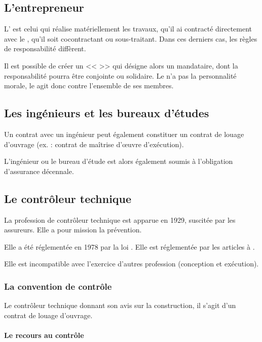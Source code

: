 		\subsection{L'entrepreneur}
		
			L'\E{} est celui qui réalise matériellement les travaux, qu'il ai contracté directement avec le \Mo{}, qu'il soit cocontractant ou sous-traitant. Dans ces derniers cas, les règles de responsabilité diffèrent.
			
			Il est possible de créer un << \GME{} >> qui désigne alors un mandataire, dont la responsabilité pourra être conjointe ou solidaire. Le \GME{} n'a pas la personnalité morale, le \Mo{} agit donc contre l'ensemble de ses membres.
		
		\subsection{Les ingénieurs et les bureaux d'études}
		
			Un contrat avec un ingénieur peut également constituer un contrat de louage d'ouvrage (ex. : contrat de maîtrise d'œuvre d'exécution).
			
			L'ingénieur ou le bureau d'étude est alors également soumis à l'obligation d'assurance décennale.
		
		\subsection{Le contrôleur technique}
		
			La profession de contrôleur technique est apparue en 1929, suscitée par les assureurs. Elle a pour mission la prévention.
			
			Elle a été réglementée en 1978 par la loi . Elle est réglementée par les articles  à .
			
			Elle est incompatible avec l'exercice d'autres profession (conception et exécution).
		
			\subsubsection{La convention de contrôle}
			
				Le contrôleur technique donnant son avis sur la construction, il s'agit d'un contrat de louage d'ouvrage.
			
				\paragraph{Le recours au contrôle}
				
